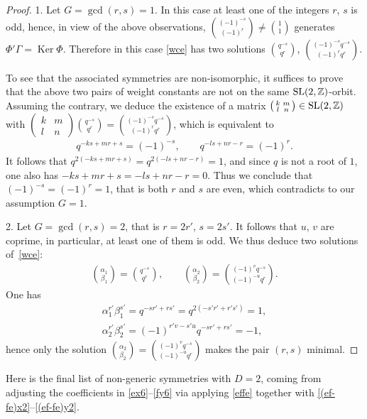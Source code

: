 \documentclass[10pt,a4paper]{amsart}
\numberwithin{equation}{section}
\begin{document}
\begin{proof}
1. Let $G=\operatorname{gcd}(r,s)=1$. In this case at least one of the integers $r$, $s$ is odd, hence, in view of the above observations, $\binom{(-1)^{-s}}{(-1)^r}\ne\binom{1}{1}$ generates $\Phi'\Gamma=\operatorname{Ker}\Phi$. Therefore in this case \eqref{wce} has two solutions $\binom{q^{-s}}{q^r}$, $\binom{(-1)^{-s}q^{-s}}{(-1)^rq^r}$.

To see that the associated symmetries are non-isomorphic, it suffices to prove that the above two pairs of weight constants are not on the same ${\rm SL}(2,\mathbb{Z})$-orbit. Assuming the contrary, we deduce the existence of a matrix $\left(\begin{smallmatrix}k & m\\ l & n\end{smallmatrix}\right)\in {\rm SL}(2,\mathbb{Z})$ with $\left(\begin{smallmatrix}k & m\\ l & n\end{smallmatrix}\right)\binom{q^{-s}}{q^r}=\binom{(-1)^{-s}q^{-s}}{(-1)^rq^r}$, which is equivalent to
\begin{gather*}
q^{-ks+mr+s} =(-1)^{-s},\qquad q^{-ls+nr-r} =(-1)^r.
\end{gather*}
It follows that $q^{2(-ks+mr+s)}=q^{2(-ls+nr-r)}=1$, and since $q$ is not a root of $1$, one also has $-ks+mr+s=-ls+nr-r=0$. Thus we conclude that $(-1)^{-s}=(-1)^r=1$, that is both $r$ and $s$ are even, which contradicts to our assumption $G=1$.

2. Let $G=\operatorname{gcd}(r,s)=2$, that is $r=2r'$, $s=2s'$. It follows that $u$, $v$ are coprime, in particular, at least one of them is odd. We thus deduce two solutions of~\eqref{wce}:
\begin{gather*}
\binom{\alpha_1}{\beta_1}=\binom{q^{-s}}{q^r},\qquad \binom{\alpha_2}{\beta_2}=\binom{(-1)^vq^{-s}}{(-1)^{-u}q^r}.
\end{gather*}
One has
\begin{gather*}
\alpha_1^{r'}\beta_1^{s'} =q^{-sr'+rs'}=q^{2(-s'r'+r's')}=1, \\
\alpha_2^{r'}\beta_2^{s'} =(-1)^{r'v-s'u}q^{-sr'+rs'}=-1,
\end{gather*}
hence only the solution $\binom{\alpha_2}{\beta_2}=\binom{(-1)^vq^{-s}}{(-1)^{-u}q^r}$ makes the pair $(r,s)$ minimal.
\end{proof}

Here is the final list of non-generic symmetries with $D=2$, coming from adjusting the coefficients in \eqref{ex6}--\eqref{fy6} via applying \eqref{effe} together with \eqref{(ef-fe)x2}--\eqref{(ef-fe)y2}.
\end{document}
